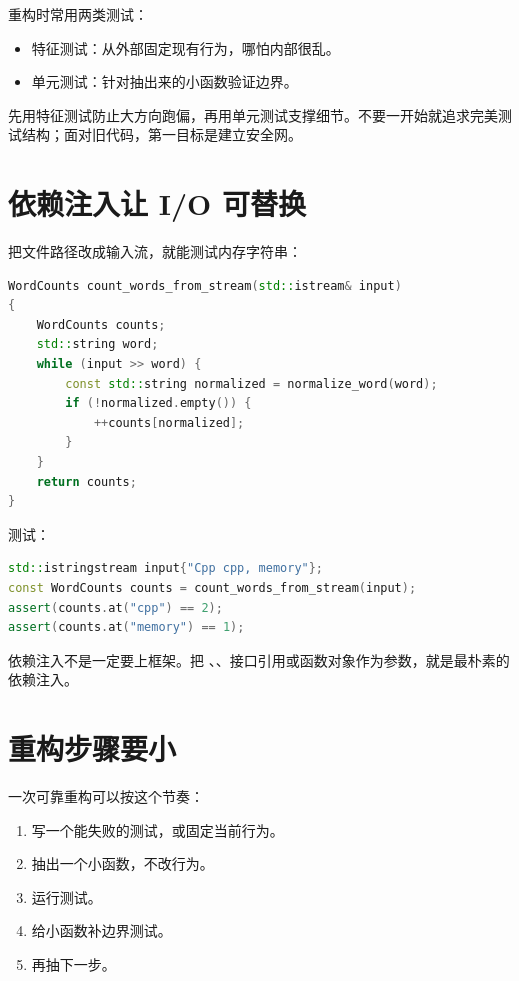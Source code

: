 重构时常用两类测试：

\begin{itemize}
  \item 特征测试：从外部固定现有行为，哪怕内部很乱。
  \item 单元测试：针对抽出来的小函数验证边界。
\end{itemize}

先用特征测试防止大方向跑偏，再用单元测试支撑细节。不要一开始就追求完美测试结构；面对旧代码，第一目标是建立安全网。

\section{依赖注入让 I/O 可替换}

把文件路径改成输入流，就能测试内存字符串：

\begin{lstlisting}[language=C++,caption={把输入流作为依赖}]
WordCounts count_words_from_stream(std::istream& input)
{
    WordCounts counts;
    std::string word;
    while (input >> word) {
        const std::string normalized = normalize_word(word);
        if (!normalized.empty()) {
            ++counts[normalized];
        }
    }
    return counts;
}
\end{lstlisting}

测试：

\begin{lstlisting}[language=C++,caption={用字符串流测试}]
std::istringstream input{"Cpp cpp, memory"};
const WordCounts counts = count_words_from_stream(input);
assert(counts.at("cpp") == 2);
assert(counts.at("memory") == 1);
\end{lstlisting}

依赖注入不是一定要上框架。把 、、接口引用或函数对象作为参数，就是最朴素的依赖注入。

\section{重构步骤要小}

一次可靠重构可以按这个节奏：

\begin{enumerate}
  \item 写一个能失败的测试，或固定当前行为。
  \item 抽出一个小函数，不改行为。
  \item 运行测试。
  \item 给小函数补边界测试。
  \item 再抽下一步。
\end{enumerate}

